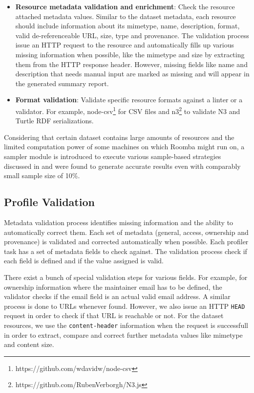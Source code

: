 \documentclass{sig-alternate}
\begin{document}
\begin{itemize}
  \item \textbf{Resource metadata validation and enrichment}: Check the resource attached metadata values. Similar to the dataset metadata, each resource should include information about its mimetype, name, description, format, valid de-referenceable URL, size, type and provenance. The validation process issue an HTTP request to the resource and automatically fills up various missing information when possible, like the mimetype and size by extracting them from the HTTP response header. However, missing fields like name and description that needs manual input are marked as missing and will appear in the generated summary report.
  \item \textbf{Format validation}: Validate specific resource formats against a linter or a validator. For example, node-csv\footnote{https://github.com/wdavidw/node-csv} for CSV files and n3\footnote{https://github.com/RubenVerborgh/N3.js} to validate N3 and Turtle RDF serializations.
\end{itemize}

Considering that certain dataset contains large amounts of resources and the limited computation power of some machines on which Roomba might run on, a sampler module is introduced to execute various sample-based strategies discussed in \cite{scalableApproach} and were found to generate accurate results even with comparably small sample size of 10\%.

\subsection{Profile Validation}

Metadata validation process identifies missing information and the ability to automatically correct them. Each set of metadata (general, access, ownership and provenance) is validated and corrected automatically when possible. Each profiler task has a set of metadata fields to check against. The validation process check if each field is defined and if the value assigned is valid.

There exist a bunch of special validation steps for various fields. For example, for ownership information where the maintainer email has to be defined, the validator checks if the email field is an actual valid email address. A similar process is done to URLs whenever found. However, we also issue an HTTP \texttt{HEAD} request in order to check if that URL is reachable or not. For the dataset resources, we use the \texttt{content-header} information when the request is successfull in order to extract, compare and correct further metadata values like mimetype and content size.
\end{document}
